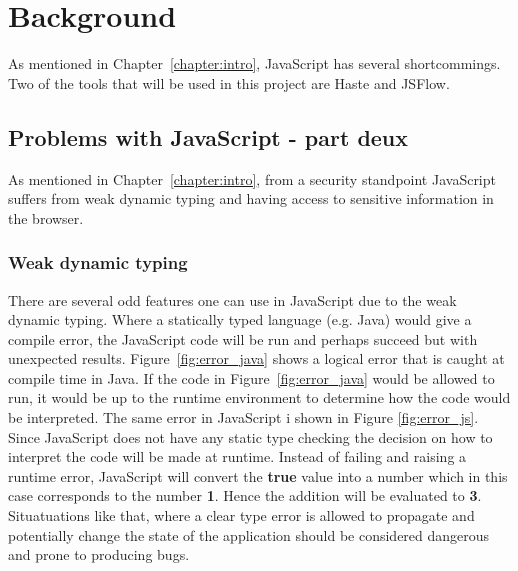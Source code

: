 \chapter{Background}
As mentioned in Chapter~\ref{chapter:intro}, JavaScript has several shortcommings. Two of the tools that will be used in this project are Haste\cite{haste-lang} and JSFlow\cite{jsflow,jsflow-csf12,jsflow-sac14}.
\section{Problems with JavaScript - part deux}
As mentioned in Chapter~\ref{chapter:intro}, from a security standpoint JavaScript suffers from weak dynamic typing and having access to sensitive information in the browser.
\subsection{Weak dynamic typing}
There are several odd features one can use in JavaScript due to the weak dynamic typing. Where a statically typed language (e.g. Java) would give a compile error, the JavaScript code will be run and perhaps succeed but with unexpected results. Figure~\ref{fig:error_java} shows a logical error that is caught at compile time in Java. If the code in Figure~\ref{fig:error_java} would be allowed to run, it would be up to the runtime environment to determine how the code would be interpreted. The same error in JavaScript i shown in Figure \ref{fig:error_js}. Since JavaScript does not have any static type checking the decision on how to interpret the code will be made at runtime. Instead of failing and raising a runtime error, JavaScript will convert the \textbf{true} value into a number which in this case corresponds to the number \textbf{1}. Hence the addition will be evaluated to \textbf{3}. Situatuations like that, where a clear type error is allowed to propagate and potentially change the state of the application should be considered dangerous and prone to producing bugs.

